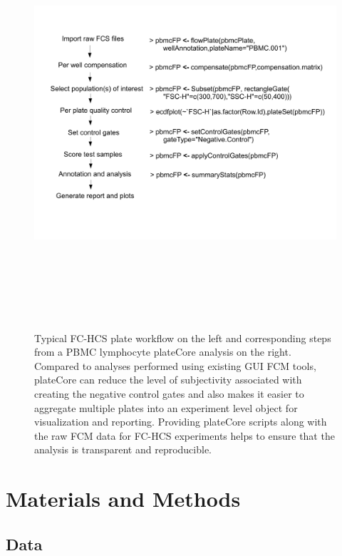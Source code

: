 \documentclass[12pt]{article}
\begin{document}
\begin{figure}
\centering
\includegraphics[width=7in,height=6in]{analysisSteps.pdf}
\caption{Typical FC-HCS plate workflow on the left and corresponding steps from a PBMC lymphocyte plateCore analysis on the right.
Compared to analyses performed using existing GUI FCM tools, plateCore can reduce the level of subjectivity associated with creating
the negative control gates and also makes it easier to aggregate multiple plates into an experiment level object for visualization and reporting.
Providing plateCore scripts along with the raw FCM data for FC-HCS experiments helps to ensure that the analysis is transparent and reproducible.
}
\label{fig:analysis}
\end{figure}
 
\clearpage
\section*{Materials and Methods}
\subsection*{Data}
\end{document}
